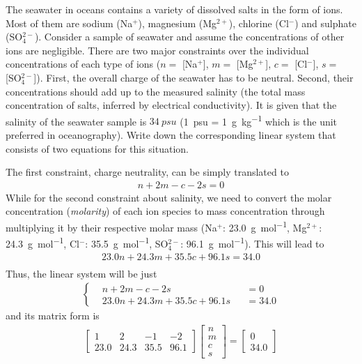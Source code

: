 \begin{exmp}
\label{exmp:seaion}
The seawater in oceans contains a variety of dissolved salts in the form of ions. Most of them are sodium (Na$^+$), magnesium (Mg$^{2+}$), chlorine (Cl$^-$) and sulphate (SO$_4^{2-}$). Consider a sample of seawater and assume the concentrations of other ions are negligible. There are two major constraints over the individual concentrations of each type of ions ($n=$ [Na$^+$], $m=$ [Mg$^{2+}$], $c=$ [Cl$^-$], $s=$ [SO$_4^{2-}$]). First, the overall charge of the seawater has to be neutral. Second, their concentrations should add up to the measured salinity (the total mass concentration of salts, inferred by electrical conductivity). It is given that the salinity of the seawater sample is $\SI{34}{psu}$ (\SI{1}{psu} = \SI{1}{\g\per\kg} which is the unit preferred in oceanography). Write down the corresponding linear system that consists of two equations for this situation.
\end{exmp}
\begin{solution}
The first constraint, charge neutrality, can be simply translated to
\begin{align*}
n + 2m - c - 2s = 0
\end{align*}
While for the second constraint about salinity, we need to convert the molar concentration (\textit{molarity}) of each ion species to mass concentration through multiplying it by their respective molar mass (Na$^+$: \SI{23.0}{\g \per \mol}, Mg$^{2+}$: \SI{24.3}{\g \per \mol}, Cl$^-$: \SI{35.5}{\g \per \mol}, SO$_4^{2-}$: \SI{96.1}{\g \per \mol}). This will lead to
\begin{align*}
23.0 n + 24.3 m + 35.5 c + 96.1s = 34.0 \\
\end{align*}
Thus, the linear system will be just
\begin{align}
\left\{\begin{alignedat}{2}
& n + 2m - c - 2s& &= 0 \\
& 23.0 n + 24.3 m + 35.5 c + 96.1s& &= 34.0
\end{alignedat}\right.
\end{align}
and its matrix form is
\begin{align*}
\begin{bmatrix}
1 & 2 & -1 & -2 \\
23.0 & 24.3 & 35.5 & 96.1    
\end{bmatrix}
\begin{bmatrix}
n \\
m \\
c \\
s
\end{bmatrix}
=
\begin{bmatrix}
0 \\
34.0
\end{bmatrix}
\end{align*}
\end{solution}

